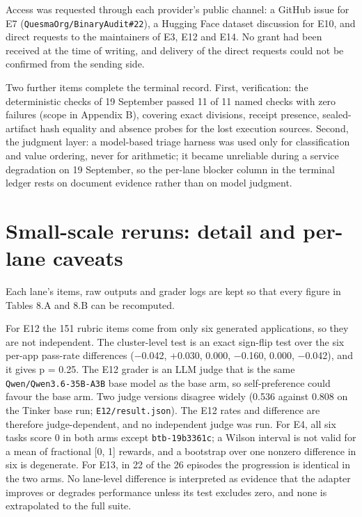 \documentclass[12pt,a4paper]{report}
\begin{document}
Access was requested through each provider's public channel: a GitHub
issue for E7 (\texttt{QuesmaOrg/BinaryAudit\#22}), a Hugging Face
dataset discussion for E10, and direct requests to the maintainers of
E3, E12 and E14. No grant had been received at the time of writing, and
delivery of the direct requests could not be confirmed from the sending
side.

Two further items complete the terminal record. First, verification: the
deterministic checks of 19 September passed 11 of 11 named checks with
zero failures (scope in Appendix B), covering exact divisions, receipt
presence, sealed-artifact hash equality and absence probes for the lost
execution sources. Second, the judgment layer: a model-based triage
harness was used only for classification and value ordering, never for
arithmetic; it became unreliable during a service degradation on 19
September, so the per-lane blocker column in the terminal ledger rests
on document evidence rather than on model judgment.

\section{Small-scale reruns: detail and per-lane
caveats}\label{small-scale-reruns-detail-and-per-lane-caveats}

Each lane's items, raw outputs and grader logs are kept so that every
figure in Tables 8.A and 8.B can be recomputed.

For E12 the 151 rubric items come from only six generated applications,
so they are not independent. The cluster-level test is an exact
sign-flip test over the six per-app pass-rate differences (−0.042,
+0.030, 0.000, −0.160, 0.000, −0.042), and it gives p = 0.25. The E12
grader is an LLM judge that is the same \texttt{Qwen/Qwen3.6-35B-A3B}
base model as the base arm, so self-preference could favour the base
arm. Two judge versions disagree widely (0.536 against 0.808 on the
Tinker base run; \texttt{E12/result.json}). The E12 rates and difference
are therefore judge-dependent, and no independent judge was run. For E4,
all six tasks score 0 in both arms except \texttt{btb-19b3361c}; a
Wilson interval is not valid for a mean of fractional {[}0, 1{]}
rewards, and a bootstrap over one nonzero difference in six is
degenerate. For E13, in 22 of the 26 episodes the progression is
identical in the two arms. No lane-level difference is interpreted as
evidence that the adapter improves or degrades performance unless its
test excludes zero, and none is extrapolated to the full suite.
\end{document}
